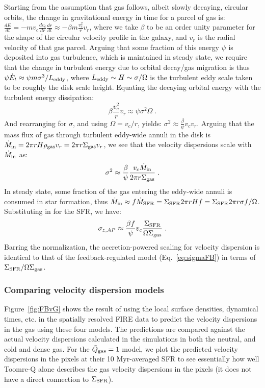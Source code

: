 \documentclass[usletter,fleqn,usenatbib]{mnras}
\newcommand{\be}{\begin{equation}}
\newcommand{\ee}{\end{equation}}
\begin{document}
\begin{enumerate}
Starting from the assumption that gas follows, albeit slowly decaying, circular orbits, the change in gravitational energy in time for a parcel of gas is: $\frac{dE}{dt} = -m v_c \frac{dv_c}{dr}\frac{dr}{dt} \approx - \beta m \frac{v_c^2}{r} v_r$, where we take $\beta$ to be an order unity parameter for the shape of the circular velocity profile in the galaxy, and $v_r$ is the radial velocity of that gas parcel.  Arguing that some fraction of this energy $\psi$ is deposited into gas turbulence, which is maintained in steady state, we require that the change in turbulent energy due to orbital decay/gas migration is thus $\psi \dot E_t \approx \psi m \sigma^3/L_{\rm eddy}$, where $L_{\rm eddy} \sim H \sim \sigma/\Omega$ is the turbulent eddy scale taken to be roughly the disk scale height.  Equating the decaying orbital energy with the turbulent energy dissipation:
\be
\beta \frac{v_c^2}{r} v_r \approx  \psi \sigma^2 \Omega \; .
\ee
And rearranging for $\sigma$, and using $\Omega = v_c/r$, yields: $\sigma^2 \approx \frac{\beta}{\psi} v_c v_r$. Arguing that the mass flux of gas through turbulent eddy-wide annuli in the disk is $\dot M_{\rm in} = 2 \pi r H \rho_{\rm gas} v_r= 2 \pi r \Sigma_{\rm gas} v_r$, we see that the velocity dispersions scale with $\dot M_{\rm in}$ as:
\be
\sigma^2 \approx {\frac{\beta}{\psi} \frac{v_c \dot M_{\rm in}}{2 \pi r \Sigma_{\rm gas}}} \; .
\ee
In steady state, some fraction of the gas entering the eddy-wide annuli is consumed in star formation, thus $\dot M_{\rm in} \approx f \dot M_{\rm SFR} = \Sigma_{\rm SFR} 2 \pi r H f = \Sigma_{\rm SFR} 2 \pi r \sigma f/\Omega$.  Substituting in for the SFR, we have:
\be \label{eq:sigmaAP}
\sigma_{z,AP} \approx \frac{\beta f}{\psi} v_c \frac{\Sigma_{\rm SFR}}{\Omega \Sigma_{\rm gas}} \; .
\ee
Barring the normalization, the accretion-powered scaling for velocity dispersion is identical to that of the feedback-regulated model (Eq.~\ref{eq:sigmaFB}) in terms of $\Sigma_{\rm SFR}/\Omega\Sigma_{\rm gas}$.



\end{enumerate}
\subsubsection{Comparing velocity dispersion models}
Figure~\ref{fig:FBvG} shows the result of using the local surface densities, dynamical times, etc. in the spatially resolved FIRE data to predict the velocity dispersions in the gas using these four models.  The predictions are compared against the actual velocity dispersions calculated in the simulations in both the neutral, and cold and dense gas.  For the $\tilde Q_{\rm gas} = 1$ model, we plot the predicted velocity dispersions in the pixels at their 10 Myr-averaged SFR to see essentially how well Toomre-Q alone describes the gas velocity dispersions in the pixels (it does not have a direct connection to $\Sigma_{\rm SFR}$).
\end{document}
